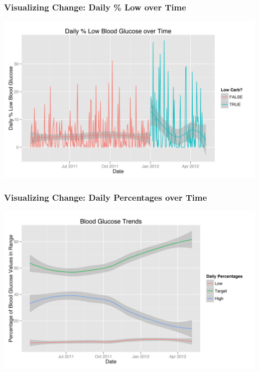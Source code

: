 \documentclass[handout]{beamer}
\begin{document}
\begin{frame}
  \frametitle{Visualizing Change: Daily \% Low over Time}
  
  \begin{center}
    \includegraphics[width=\textwidth]{daily_low.jpg}
  \end{center}

\end{frame}

\begin{frame}
  \frametitle{Visualizing Change: Daily Percentages over Time}
  
  \begin{center}
    \includegraphics[width=\textwidth]{percentages.jpg}
  \end{center}

\end{frame}
\end{document}
